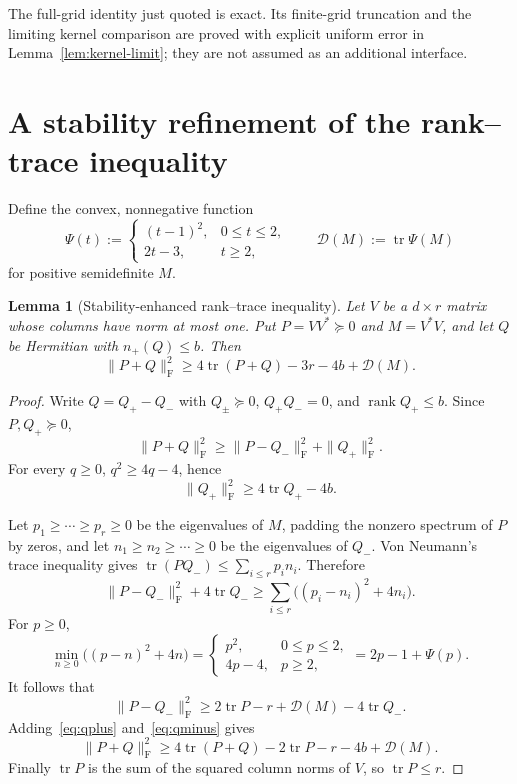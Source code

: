\documentclass[11pt]{article}
\newtheorem{lemma}[theorem]{Lemma}
\DeclareMathOperator{\tr}{tr}
\DeclareMathOperator{\rank}{rank}
\newcommand{\Frob}{\mathrm F}
\newcommand{\cD}{\mathcal D}
\begin{document}
The full-grid identity just quoted is exact.  Its finite-grid truncation and
the limiting kernel comparison are proved with explicit uniform error in
Lemma~\ref{lem:kernel-limit}; they are not assumed as an additional
interface.

\section{A stability refinement of the rank--trace inequality}
\label{sec:stability}

Define the convex, nonnegative function
\begin{equation}\label{eq:Psi}
 \Psi(t):=
 \begin{cases}
  (t-1)^2,&0\le t\le2,\\
  2t-3,&t\ge2,
 \end{cases}
 \qquad
 \cD(M):=\tr\Psi(M)
\end{equation}
for positive semidefinite $M$.

\begin{lemma}[Stability-enhanced rank--trace inequality]
\label{lem:stable-rank-trace}
Let $V$ be a $d\times r$ matrix whose columns have norm at most one.  Put
$P=VV^*\succeq0$ and $M=V^*V$, and let $Q$ be Hermitian with
$n_+(Q)\le b$.  Then
\begin{equation}\label{eq:stable-rank-trace}
 \|P+Q\|_{\Frob}^2
 \ge4\tr(P+Q)-3r-4b+\cD(M).
\end{equation}
\end{lemma}

\begin{proof}
Write $Q=Q_+-Q_-$ with $Q_\pm\succeq0$, $Q_+Q_-=0$, and
$\rank Q_+\le b$.  Since $P,Q_+\succeq0$,
\[
 \|P+Q\|_{\Frob}^2
 \ge\|P-Q_-\|_{\Frob}^2+\|Q_+\|_{\Frob}^2.
\]
For every $q\ge0$, $q^2\ge4q-4$, hence
\begin{equation}\label{eq:qplus}
 \|Q_+\|_{\Frob}^2\ge4\tr Q_+-4b.
\end{equation}

Let $p_1\ge\cdots\ge p_r\ge0$ be the eigenvalues of $M$, padding the
nonzero spectrum of $P$ by zeros, and let $n_1\ge n_2\ge\cdots\ge0$ be the
eigenvalues of $Q_-$.  Von Neumann's trace inequality gives
$\tr(PQ_-)\le\sum_{i\le r}p_in_i$.  Therefore
\[
 \|P-Q_-\|_{\Frob}^2+4\tr Q_-
 \ge\sum_{i\le r}\bigl((p_i-n_i)^2+4n_i\bigr).
\]
For $p\ge0$,
\begin{equation}\label{eq:scalar-min}
 \min_{n\ge0}\bigl((p-n)^2+4n\bigr)
 =\begin{cases}p^2,&0\le p\le2,\\4p-4,&p\ge2,
 \end{cases}
 =2p-1+\Psi(p).
\end{equation}
It follows that
\begin{equation}\label{eq:qminus}
 \|P-Q_-\|_{\Frob}^2
 \ge2\tr P-r+\cD(M)-4\tr Q_-.
\end{equation}
Adding~\eqref{eq:qplus} and~\eqref{eq:qminus} gives
\[
 \|P+Q\|_{\Frob}^2
 \ge4\tr(P+Q)-2\tr P-r-4b+\cD(M).
\]
Finally $\tr P$ is the sum of the squared column norms of $V$, so
$\tr P\le r$.
\end{proof}
\end{document}
